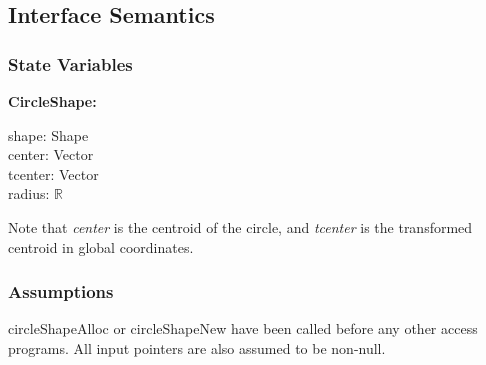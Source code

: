 \documentclass[12pt]{article}
\newcommand{\R}{$\mathbb{R}$}
\begin{document}
\subsection{Interface Semantics}

\subsubsection{State Variables} \label{SecSVCircle}
	\textbf{CircleShape:}
	\begin{multicols}{2}
		\noindent shape: Shape \\
		center: Vector \\
		tcenter: Vector \\
		radius: \R
	\end{multicols}
	\noindent Note that \textit{center} is the centroid of the circle, and \textit{tcenter} is the transformed centroid in global coordinates.
	
\subsubsection{Assumptions} \label{SecACircle}
	circleShapeAlloc or circleShapeNew have been called before any other access programs. All input pointers are also assumed to be non-null.
	
\end{document}
